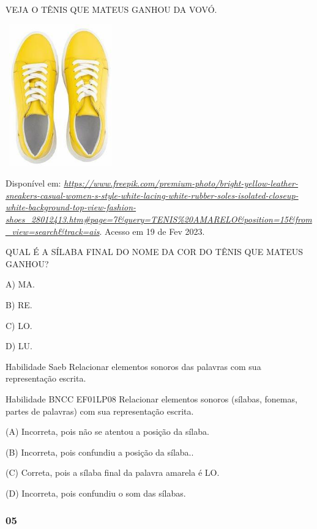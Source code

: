 \begin{escola}
\protect\hypertarget{_heading=h.1hmsyys}{}{}VEJA O TÊNIS QUE MATEUS
GANHOU DA VOVÓ.

\includegraphics[width=1.87986in,height=2.41667in]{media/image189.jpg}

Disponível em:
\href{https://www.freepik.com/premium-photo/bright-yellow-leather-sneakers-casual-women-s-style-white-lacing-white-rubber-soles-isolated-closeup-white-background-top-view-fashion-shoes_28012413.htm\#page=7\&query=TENIS\%20AMARELO\&position=15\&from_view=search\&track=ais}{\emph{https://www.freepik.com/premium-photo/bright-yellow-leather-sneakers-casual-women-s-style-white-lacing-white-rubber-soles-isolated-closeup-white-background-top-view-fashion-shoes\_28012413.htm\#page=7\&query=TENIS\%20AMARELO\&position=15\&from\_view=search\&track=ais}}.
Acesso em 19 de Fev 2023.

QUAL É A SÍLABA FINAL DO NOME DA COR DO TÊNIS QUE MATEUS GANHOU?

A) MA.

B) RE.

C) LO.

D) LU.

\protect\hypertarget{_heading=h.41mghml}{}{}Habilidade Saeb Relacionar
elementos sonoros das palavras com sua representação escrita.

Habilidade BNCC EF01LP08 Relacionar elementos sonoros (sílabas, fonemas,
partes de palavras) com sua representação escrita.

\protect\hypertarget{_heading=h.2grqrue}{}{}(A) Incorreta, pois não se
atentou a posição da sílaba.

(B) Incorreta, pois confundiu a posição da sílaba..

(C) Correta, pois a sílaba final da palavra amarela é LO.

(D) Incorreta, pois confundiu o som das sílabas.

\subsubsection{05}\label{section-30}


\end{escola}
